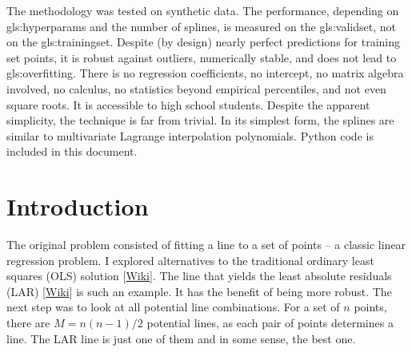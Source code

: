 \documentclass[oneside,10pt]{book}
\begin{document}
The methodology was tested on synthetic data. The performance, depending on \glspl{gls:hyperparam} and the number of splines, is measured on the \gls{gls:validset}, not on the \gls{gls:trainingset}. Despite (by design) nearly perfect predictions for training set points, it is robust against outliers, numerically stable, and does not lead to \gls{gls:overfitting}. There is no regression coefficients, no intercept, no matrix algebra involved, no calculus, no statistics beyond empirical percentiles, and not even square roots. It is accessible to high school students. Despite the apparent simplicity, the technique is far from trivial. In its simplest form, the splines are similar to multivariate Lagrange interpolation polynomials. Python code is included in this document.


\hypersetup{linkcolor=red}

\section{Introduction}\label{fregi1}


The original problem consisted of fitting a line to a set of points -- a classic linear regression problem. I explored alternatives to the traditional \textcolor{index}{ordinary least squares} (OLS) 
solution [\href{https://en.wikipedia.org/wiki/Ordinary_least_squares}{Wiki}]. The line that yields the \textcolor{index}{least absolute residuals} (LAR) [\href{https://en.wikipedia.org/wiki/Least_absolute_deviations}{Wiki}] is such an example. It has the benefit of being more robust. The next step was to look at all potential line combinations. For a set of $n$ points, there are $M=n(n-1)/2$ potential lines, as each pair of points determines a line. The LAR line is just one of them and in some sense, the best one.  
\end{document}
